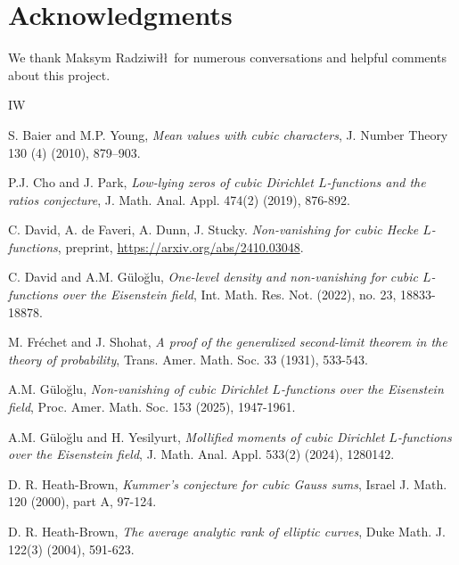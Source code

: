 \documentclass[11pt]{amsart}
\numberwithin{equation}{section}
\theoremstyle{remark}
\begin{document}
\section*{Acknowledgments}
We thank Maksym Radziwi\l\l \ for numerous conversations and helpful comments about this project. 



\begin{thebibliography}{IW}

 S. Baier and M.P. Young, {\it Mean values with cubic characters}, J. Number Theory  130 (4) (2010), 879–903.



 P.J. Cho and J. Park, {\it Low-lying zeros of cubic Dirichlet $L$-functions and the ratios conjecture}, J. Math. Anal. Appl.  474(2) (2019), 876-892.

 C. David, A. de Faveri, A. Dunn, J. Stucky. {\it Non-vanishing for cubic Hecke $L$-functions}, preprint, \url{https://arxiv.org/abs/2410.03048}.

  C. David and A.M. G\"ulo\u{g}lu, {\it  One-level density and non-vanishing for cubic $L$-functions over the Eisenstein field}, Int. Math. Res. Not. (2022), no. 23, 18833-18878.


  M. Fr\'echet and J. Shohat, 
{\it A proof of the generalized second-limit theorem in the theory of probability},
Trans. Amer. Math. Soc.  33 (1931), 533-543.

 A.M. G\"ulo\u{g}lu, {\it Non-vanishing of cubic Dirichlet $L$-functions over the Eisenstein field}, Proc. Amer. Math. Soc. 153 (2025), 1947-1961.

 A.M. G\"ulo\u{g}lu and H. Yesilyurt, {\it Mollified moments of cubic Dirichlet $L$-functions over the Eisenstein field}, J. Math. Anal. Appl.  533(2) (2024), 1280142.


D. R. Heath-Brown, {\it Kummer’s conjecture for cubic Gauss sums}, Israel J. Math. 120 (2000), part A, 97-124.

D. R. Heath-Brown, {\it  The average analytic rank of elliptic curves}, Duke Math. J. 122(3) (2004), 591-623.


\end{thebibliography}
\end{document}
